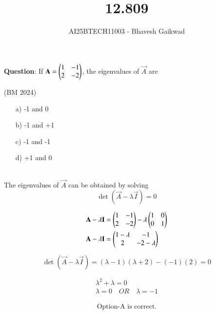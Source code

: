 \documentclass[journal]{IEEEtran}
\begin{document}

\vspace{3cm}

\title{12.809}
\author{AI25BTECH11003 - Bhavesh Gaikwad}
{\let\newpage\relax\maketitle}

\renewcommand{\thefigure}{\theenumi}
\renewcommand{\thetable}{\theenumi}
\setlength{\intextsep}{10pt} 

\renewcommand{\thetable}{\theenumi}


\textbf{Question}: If $\mathbf{A} = \begin{pmatrix}1 & -1 \\ 2 & -2\end{pmatrix}$, the eigenvalues of $\vec{A}$ are 

\hfill{(BM 2024)}

\begin{itemize}
    \item[a)]-1 and 0
    \item[b)]-1 and +1
    \item[c)]-1 and -1
    \item[d)]+1 and 0
\end{itemize}

\bigskip

 \solution 
 \\

The eigenvalues of $\vec{A}$ can be obtained by solving
\begin{equation}
    \det(\vec{A} - \lambda\vec{I}) = 0 
\end{equation}

\begin{align}
 \mathbf{A} - \lambda\mathbf{I} &= \begin{pmatrix}1 & -1 \\ 2 & -2\end{pmatrix} - \lambda\begin{pmatrix}1 & 0 \\ 0 & 1\end{pmatrix}\\
 \mathbf{A} - \lambda\mathbf{I} &= \begin{pmatrix}1-\lambda & -1 \\ 2 & -2-\lambda\end{pmatrix}
\end{align}

\begin{equation}
    \det(\vec{A} - \lambda\vec{I}) = (\lambda - 1)(\lambda + 2) - (-1)(2) = 0 
\end{equation}

\begin{align}
    \lambda^2 + \lambda = 0 \\
    \lambda = 0 \quad OR \quad \lambda = -1
\end{align}

    \begin{align*}
        \boxed{\text{Option-A is correct.}}
    \end{align*}
\end{document}
